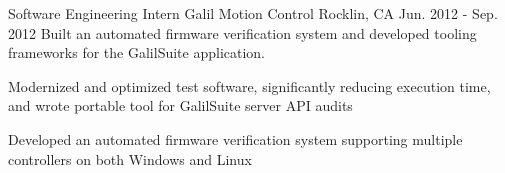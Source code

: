\begin{cventries}
\cventry
    {Software Engineering Intern} %
    {Galil Motion Control} %
    {Rocklin, CA} %
    {Jun. 2012 - Sep. 2012} %
    {Built an automated firmware verification system and developed tooling frameworks for the GalilSuite application.} %
    {
      \begin{cvitems} %
        \item {Modernized and optimized test software, significantly reducing execution time, and wrote portable tool for GalilSuite server API audits}
        \item {Developed an automated firmware verification system supporting multiple controllers on both Windows and Linux} 
      \end{cvitems}
    }

\end{cventries}
